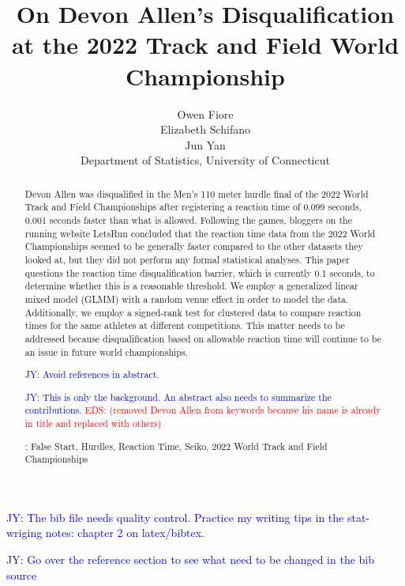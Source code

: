 \documentclass[12pt, letterpaper, titlepage]{article}
\title{On Devon Allen's Disqualification at the 2022 Track and Field World
Championship}
\author{Owen Fiore\\
  Elizabeth Schifano\\
  Jun Yan\\[1ex]
  Department of Statistics, University of Connecticut\\
}
\date{}
\newcommand{\jy}[1]{\textcolor{blue}{JY: #1}}
\newcommand{\eds}[1]{\textcolor{red}{EDS: (#1)}}
\begin{document}
\maketitle

\begin{abstract}
Devon Allen was disqualified in the Men's 110 meter hurdle final of the 2022
World Track and Field Championships after registering a reaction time of 0.099 
seconds, 0.001 seconds faster than what is allowed. Following the games, 
bloggers on the running website LetsRun %
concluded that the reaction time data from the 2022 World Championships 
seemed to be generally faster compared to the other datasets they looked at, but 
they did not perform any formal %
statistical analyses. This paper questions the reaction time 
disqualification barrier, which is currently 0.1 seconds, to determine whether 
this is a reasonable threshold. We employ a generalized linear mixed model 
(GLMM) with a random %
venue effect in order to %
model the data. Additionally, we employ a signed-rank test for clustered data to 
compare reaction times for the same athletes at different competitions. This 
matter needs to be addressed because %
disqualification based on allowable reaction time 
will continue to be an issue in future world championships.

\jy{Avoid references in abstract.}

  
\jy{This is only the background. An abstract also needs to summarize the 
contributions.}
\eds{removed Devon Allen from keywords because his name is already in title
and replaced with others}

\noindent{}:
False Start, Hurdles, Reaction Time, Seiko, 2022 World Track and Field Championships 

\end{abstract}

\doublespace

\jy{The bib file needs quality control. Practice my writing tips in the
  stat-wriging notes: chapter 2 on latex/bibtex.}

\jy{Go over the reference section to see what need to be changed in the bib source}
\end{document}
